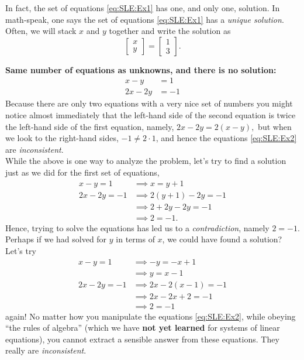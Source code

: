 In fact, the set of equations \eqref{eq:SLE:Ex1} has one, and only one, solution. In math-speak, one says the set of equations \eqref{eq:SLE:Ex1} has a \textit{unique solution}. Often, we will stack $x$ and $y$ together and write the solution as
$$\begin{bmatrix} x \\ y\end{bmatrix} = \left[\begin{array}{l}
1 \\ 3 \end{array}  \right].$$

\noindent \textbf{Same number of equations as unknowns, and there is no solution:}
\begin{equation}
\label{eq:SLE:Ex2}
\begin{aligned}
x-y &=1 \\
2x-2y&=-1
\end{aligned}
\end{equation}
Because there are only two equations with a very nice set of numbers you might notice almost immediately that the left-hand side of the second equation is twice the left-hand side of the first equation, namely, $2 x - 2y = 2(x-y),$ but when we look to the right-hand sides, $-1 \neq 2 \cdot 1$, and hence the equations \eqref{eq:SLE:Ex2} are \textit{inconsistent}. \\

While the above is one way to analyze the problem, let's try to find a solution just as we did for the first set of equations, 
\begin{align*}
x-y =1 & \implies x = y+1 \\
2x-2y=-1&  \implies 2(y+1)-2y = -1\\
& \implies 2 + 2y - 2y = -1 \\
& \implies 2 = -1.
\end{align*}
Hence, trying to solve the equations has led us to a \textit{contradiction}, namely $2=-1$. Perhaps if we had solved for $y$ in terms of $x$, we could have found a solution? Let's try
\begin{align*}
x-y =1 & \implies -y = -x+1 \\
& \implies y = x-1 \\
2x-2y=-1&  \implies 2x-2(x-1) = -1\\
& \implies 2x -2x +2 = -1 \\
& \implies 2 = -1
\end{align*}
again! No matter how you manipulate the equations \eqref{eq:SLE:Ex2}, while obeying ``the rules of algebra'' (which we have \textbf{not yet learned} for systems of linear equations), you cannot extract a sensible answer from these equations. They really are \textit{inconsistent}. \\


